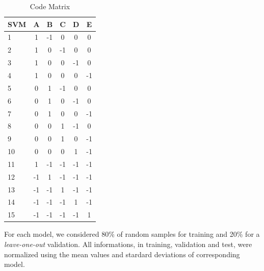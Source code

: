 \documentclass[10pt,twocolumn,letterpaper]{article}
\begin{document}
\begin{table}[H]
\begin{center}
\caption{Code Matrix}
\begin{tabular}{|l|*5{c|}}
\hline
\textbf{SVM}& A & B & C & D & E \\ \hline
1& 1 & -1& 0 & 0 & 0 \\ \hline
2& 1 & 0 & -1& 0 & 0 \\ \hline
3& 1 & 0 & 0 & -1& 0 \\ \hline
4& 1 & 0 & 0 & 0 & -1 \\ \hline
5& 0 & 1 & -1& 0 & 0 \\ \hline
6& 0 & 1 & 0 & -1& 0 \\ \hline
7& 0 & 1 & 0 & 0 & -1 \\ \hline
8& 0 & 0 & 1 & -1&  0 \\ \hline
9& 0 & 0 & 1 & 0 & -1 \\ \hline
10& 0 & 0 & 0 & 1 & -1 \\ \hline
11& 1 & -1& -1& -1& -1 \\ \hline
12& -1& 1 & -1& -1& -1 \\ \hline
13& -1& -1&  1& -1& -1 \\ \hline
14& -1& -1& -1&  1& -1 \\ \hline
15& -1& -1& -1& -1&  1 \\ \hline
\end{tabular}
\end{center}
\end{table}

For each model, we considered 80\% of random samples for 
training and 20\% for a \emph{leave-one-out} validation. All informations, in
training, validation and test, were normalized using the mean values and
stardard deviations of corresponding model.
\end{document}
